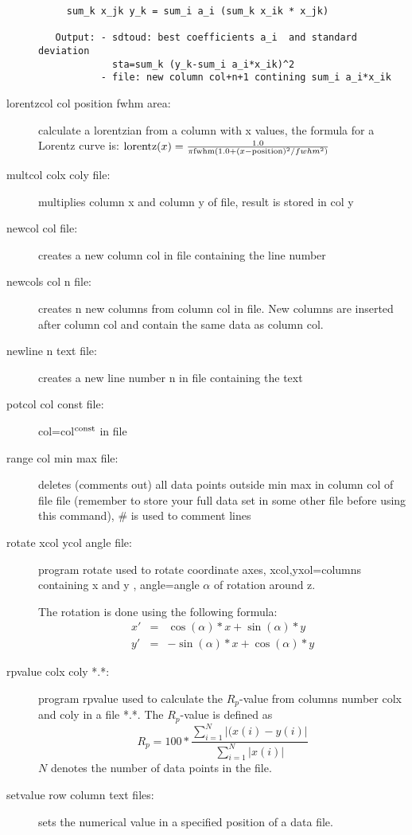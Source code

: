 \begin{description}
\begin{verbatim}
     sum_k x_jk y_k = sum_i a_i (sum_k x_ik * x_jk)

   Output: - sdtoud: best coefficients a_i  and standard deviation
             sta=sum_k (y_k-sum_i a_i*x_ik)^2
           - file: new column col+n+1 contining sum_i a_i*x_ik
\end{verbatim}

\item [\prg lorentzcol\index{lorentzcol} col position fwhm area:] calculate a lorentzian from
a column with x values, the formula for a Lorentz curve is: 
${\rm lorentz}(x)=\frac{1.0}{\pi{\rm fwhm}(1.0+(x-{\rm position})^2/fwhm^2)}$
\item [\prg multcol\index{multcol}  colx coly file:] multiplies column x and column y of file, %
result is stored in col y
\item [\prg newcol\index{newcol} col file:] creates a new column col in file containing the line %
number
\item [\prg newcols\index{newcols} col n file:] creates n new columns from column col
 in file. New columns are inserted after column col and contain the same data as column col.
\item [\prg newline\index{newline} n text file:] creates a new line number n  in file containing %
the text 
\item [\prg potcol\index{potcol} col const file:]  col=col$^{\rm const}$ in file
\item [\prg range\index{range} col min max file:] deletes (comments out) all data points outside %
min max in column  col of
                       file file (remember to store your full data set in some other
		       file before using this command), \# is used to comment lines
\item[\prg rotate\index{rotate} xcol ycol angle file:]
program rotate  used to rotate coordinate axes,
 xcol,yxol=columns containing x and y , 
 angle=angle $\alpha$ of rotation around z.
 
 The rotation is done using the following formula:
\begin{eqnarray}
 x'&= &\cos(\alpha)*x+\sin(\alpha)*y \nonumber \\
 y'&=&-\sin(\alpha)*x+\cos(\alpha)*y
\end{eqnarray}
\item [\prg rpvalue\index{rpvalue} colx coly  *.*:]  program rpvalue  used to %
calculate 
                       the $R_p$-value from columns number colx and coly 
		       in a file *.*. The $R_p$-value is defined as
		       \begin{equation}
		       R_p= 100*\frac{\sum_{i=1}^{N} |(x(i)-y(i)|}{\sum_{i=1}^{N}|x(i)|}
		       \end{equation}
                       $N$ denotes the number of data points in the file.
\item [\prg setvalue\index{setvalue} row column text files:] sets the numerical value in a specified position of a data file.


\end{description}
